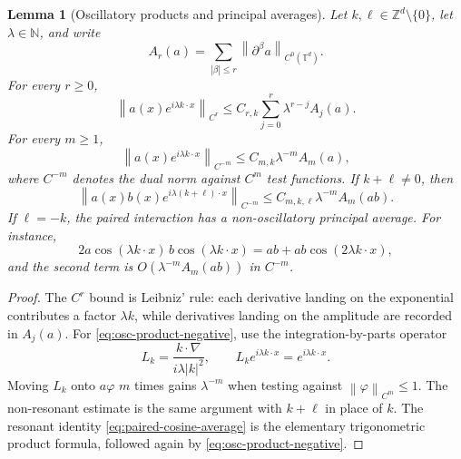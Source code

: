 \documentclass[11pt]{article}
\numberwithin{equation}{section}
\newtheorem{lemma}[theorem]{Lemma}
\newcommand{\norm}[1]{\left\lVert #1\right\rVert}
\begin{document}
\begin{lemma}[Oscillatory products and principal averages]
\label{lem:oscillatory-product-averaging}
Let \(k,\ell\in\mathbb Z^d\setminus\{0\}\), let \(\lambda\in\mathbb N\), and
write
\[
  A_r(a)=\sum_{|\beta|\le r}\norm{\partial^\beta a}_{C^0(\mathbb T^d)} .
\]
For every \(r\ge0\),
\begin{equation}
  \norm{a(x)e^{i\lambda k\cdot x}}_{C^r}
  \le
  C_{r,k}\sum_{j=0}^r
  \lambda^{r-j}A_j(a).
  \label{eq:osc-product-Cr}
\end{equation}
For every \(m\ge1\),
\begin{equation}
  \norm{a(x)e^{i\lambda k\cdot x}}_{C^{-m}}
  \le C_{m,k}\lambda^{-m}A_m(a),
  \label{eq:osc-product-negative}
\end{equation}
where \(C^{-m}\) denotes the dual norm against \(C^m\) test functions.  If
\(k+\ell\ne0\), then
\begin{equation}
  \norm{a(x)b(x)e^{i\lambda(k+\ell)\cdot x}}_{C^{-m}}
  \le C_{m,k,\ell}\lambda^{-m}A_m(ab).
  \label{eq:nonresonant-product}
\end{equation}
If \(\ell=-k\), the paired interaction has a non-oscillatory principal
average.  For instance,
\begin{equation}
  2a\cos(\lambda k\cdot x)\,b\cos(\lambda k\cdot x)
  =
  ab+ab\cos(2\lambda k\cdot x),
  \label{eq:paired-cosine-average}
\end{equation}
and the second term is \(O(\lambda^{-m}A_m(ab))\) in \(C^{-m}\).
\end{lemma}

\begin{proof}
The \(C^r\) bound is Leibniz' rule: each derivative landing on the exponential
contributes a factor \(\lambda k\), while derivatives landing on the amplitude
are recorded in \(A_j(a)\).  For \eqref{eq:osc-product-negative}, use the
integration-by-parts operator
\[
  L_k=\frac{k\cdot\nabla}{i\lambda |k|^2},
  \qquad
  L_ke^{i\lambda k\cdot x}=e^{i\lambda k\cdot x}.
\]
Moving \(L_k\) onto \(a\varphi\) \(m\) times gains \(\lambda^{-m}\) when
testing against \(\norm{\varphi}_{C^m}\le1\).  The non-resonant estimate is the
same argument with \(k+\ell\) in place of \(k\).  The resonant identity
\eqref{eq:paired-cosine-average} is the elementary trigonometric product
formula, followed again by \eqref{eq:osc-product-negative}.
\end{proof}
\end{document}
